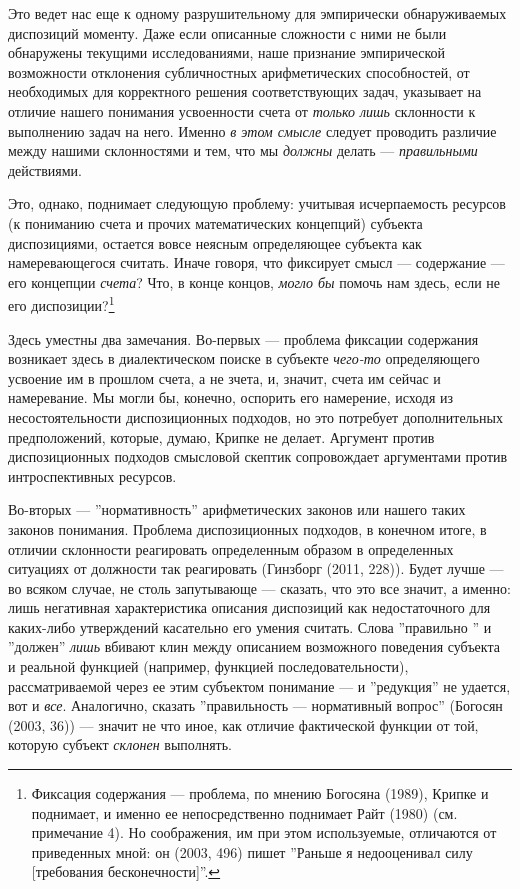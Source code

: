 \documentclass[11pt]{book}
\begin{document}
Это ведет нас еще к одному разрушительному для эмпирически обнаруживаемых диспозиций моменту. Даже если описанные сложности с ними не были обнаружены текущими исследованиями, наше признание эмпирической возможности отклонения субличностных арифметических способностей, от необходимых для корректного решения соответствующих задач, указывает на отличие нашего понимания усвоенности счета от \textit{только лишь} склонности к выполнению задач на него. Именно \textit{в этом смысле} следует проводить различие между нашими склонностями и тем, что мы \textit{должны} делать --- \textit{правильными} действиями.

Это, однако, поднимает следующую проблему: учитывая исчерпаемость ресурсов (к пониманию счета и прочих математических концепций) субъекта диспозициями, остается вовсе неясным определяющее субъекта как намеревающегося считать. Иначе говоря, что фиксирует смысл --- содержание --- его концепции \textit{счета}? Что, в конце концов, \textit{могло бы} помочь нам здесь, если не его диспозиции?\footnote{Фиксация содержания --- проблема, по мнению Богосяна (1989), Крипке и поднимает, и именно ее непосредственно поднимает Райт (1980) (см. примечание 4). Но соображения, им при этом используемые, отличаются от приведенных мной: он (2003, 496) пишет ''Раньше я недооценивал силу [требования бесконечности]''.}

Здесь уместны два замечания. Во-первых --- проблема фиксации содержания возникает здесь в диалектическом поиске в субъекте \textit{чего-то} определяющего усвоение им в прошлом счета, а не зчета, и, значит, счета им сейчас и намеревание. Мы могли бы, конечно, оспорить его намерение, исходя из несостоятельности диспозиционных подходов, но это потребует дополнительных предположений, которые, думаю, Крипке не делает. Аргумент против диспозиционных подходов смысловой скептик сопровождает аргументами против интроспективных ресурсов.

Во-вторых --- ''нормативность'' арифметических законов или нашего таких законов понимания. Проблема диспозиционных подходов, в конечном итоге, в отличии склонности реагировать определенным образом в определенных ситуациях от должности так реагировать (Гинзборг (2011, 228)). Будет лучше --- во всяком случае, не столь запутывающе --- сказать, что это все значит, а именно: лишь негативная характеристика описания диспозиций как недостаточного для каких-либо утверждений касательно его умения считать. Слова ''правильно '' и ''должен'' \textit{лишь} вбивают клин между описанием возможного поведения субъекта и реальной функцией (например, функцией последовательности), рассматриваемой через ее этим субъектом понимание --- и ''редукция'' не удается, вот и \textit{все}. Аналогично, сказать ''правильность --- нормативный вопрос'' (Богосян (2003, 36)) --- значит не что иное, как отличие фактической функции от той, которую субъект \textit{склонен} выполнять.
\end{document}
